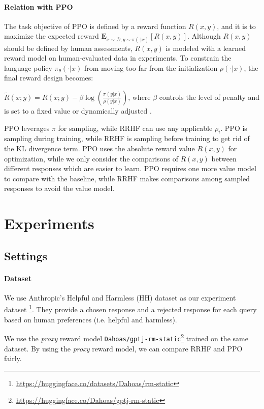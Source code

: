 \paragraph{Relation with PPO}

The task objective of PPO \cite{schulman2017proximal} is defined by a reward function $R(x,y)$, and it is to maximize the expected reward $\mathbf{E}_{x\sim \mathcal{D},y\sim \pi(\cdot|x)}\left[ R(x,y) \right]$.
Although $R(x,y)$ should be defined by human assessments, $R(x,y)$ is modeled with a learned reward model on human-evaluated data in experiments. To constrain the language policy $\pi_\theta(\cdot|x)$ from moving too far from the initialization $\rho(\cdot|x)$, the final reward design becomes:

$\tilde{R}(x;y) = R(x;y)  - \beta \log\left(\frac{\pi(y|x)}{\rho(y|x)}\right)$,
where $\beta$ controls the level of penalty and is set to a fixed value \cite{instructgpt} or dynamically adjusted \cite{ziegler2019fine}.

PPO leverages $\pi$ for sampling, while RRHF can use any applicable $\rho_i$. 
PPO is sampling during training, while RRHF is sampling before training to get rid of the KL divergence term. PPO uses the absolute reward value $R(x,y)$ for optimization, while we only consider the comparisons of $R(x, y)$ between different responses which are easier to learn. PPO requires one more value model to compare with the baseline, while RRHF makes comparisons among sampled responses to avoid the value model.

\section{Experiments}

\subsection{Settings}

\paragraph{Dataset}
We use Anthropic’s Helpful and Harmless (HH) dataset as our experiment dataset \cite{bai2022training}\footnote{\url{https://huggingface.co/datasets/Dahoas/rm-static}}. 
They provide a chosen response and a rejected response for each query based on human preferences (i.e. helpful and harmless).

We use the \textit{proxy} reward model \texttt{Dahoas/gptj-rm-static}\footnote{\url{https://huggingface.co/Dahoas/gptj-rm-static}} trained on the same dataset. By using the \textit{proxy} reward model, we can compare RRHF and PPO fairly.

